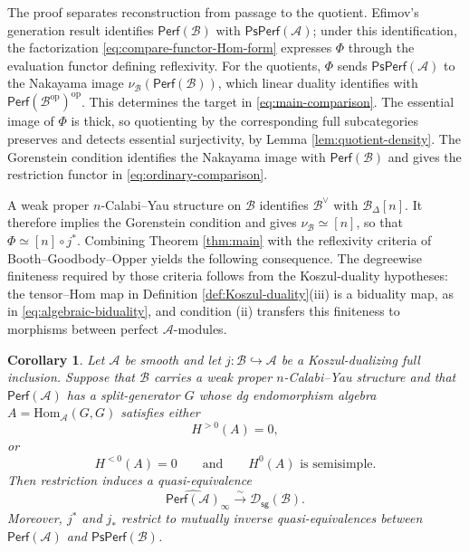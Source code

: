 \documentclass[11pt,letterpaper,reqno]{amsart}
\theoremstyle{plain}
\theoremstyle{definition}
\theoremstyle{plain}
\newtheorem{maincorollary}[maincorollary]{Corollary}
\theoremstyle{definition}
\numberwithin{equation}{section}
\begin{document}
The proof separates reconstruction from passage to the quotient.
Efimov's generation result identifies $\mathsf{Perf}(\mathscr B)$ with $\mathsf{PsPerf}(\mathscr A)$; under this identification, the factorization \eqref{eq:compare-functor-Hom-form} expresses $\Phi$ through the evaluation functor defining reflexivity.
For the quotients, $\Phi$ sends $\mathsf{PsPerf}(\mathscr A)$ to the Nakayama image $\nu_{\mathscr B}(\mathsf{Perf}(\mathscr B))$, which linear duality identifies with $\mathsf{Perf}(\mathscr B^{\mathrm{op}})^{\mathrm{op}}$.
This determines the target in \eqref{eq:main-comparison}.
The essential image of $\Phi$ is thick, so quotienting by the corresponding full subcategories preserves and detects essential surjectivity, by Lemma \ref{lem:quotient-density}.
The Gorenstein condition identifies the Nakayama image with $\mathsf{Perf}(\mathscr B)$ and gives the restriction functor in \eqref{eq:ordinary-comparison}.

A weak proper $n$-Calabi--Yau structure on $\mathscr B$ identifies $\mathscr B^\vee$ with $\mathscr B_\Delta[n]$.
It therefore implies the Gorenstein condition and gives $\nu_{\mathscr B}\simeq[n]$, so that $\Phi\simeq[n]\circ j^*$.
Combining Theorem \ref{thm:main} with the reflexivity criteria of Booth--Goodbody--Opper yields the following consequence.
The degreewise finiteness required by those criteria follows from the Koszul-duality hypotheses: the tensor--Hom map in Definition \ref{def:Koszul-duality}(iii) is a biduality map, as in \eqref{eq:algebraic-biduality}, and condition (ii) transfers this finiteness to morphisms between perfect $\mathscr A$-modules.

\begin{maincorollary}\label{cor:main}
Let $\mathscr A$ be smooth and let $j:\mathscr B\hookrightarrow\mathscr A$ be a Koszul-dualizing full inclusion.
Suppose that $\mathscr B$ carries a weak proper $n$-Calabi--Yau structure and that $\mathsf{Perf}(\mathscr A)$ has a split-generator $G$ whose dg endomorphism algebra $A=\mathrm{Hom}_{\mathscr A}(G,G)$ satisfies either
\begin{equation}\label{eq:connective}
H^{>0}(A)=0,
\end{equation}
or
\begin{equation}\label{eq:coconnective}
H^{<0}(A)=0
\qquad\text{and}\qquad
H^0(A)\text{ is semisimple}.
\end{equation}
Then restriction induces a quasi-equivalence
\[
\widehat{\mathsf{Perf}(\mathscr A)}_\infty
\xrightarrow{\;\sim\;}\mathscr D_{\mathsf{sg}}(\mathscr B).
\]
Moreover, $j^*$ and $j_*$ restrict to mutually inverse quasi-equivalences between $\mathsf{Perf}(\mathscr A)$ and $\mathsf{PsPerf}(\mathscr B)$.
\end{maincorollary}
\end{document}
